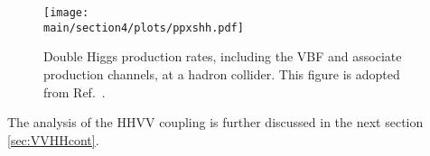 \begin{figure}[!t]
\centering
   \texttt{[image: \\main/section4/plots/ppxshh.pdf]}
  \caption{Double Higgs production rates, including the VBF  and associate production channels, at a hadron collider. This figure is adopted from Ref.~\cite{Frederix:2014hta}. \label{fig:xshh}}
\end{figure}


The analysis of the HHVV coupling is further discussed in the next section \ref{sec:VVHHcont}.





